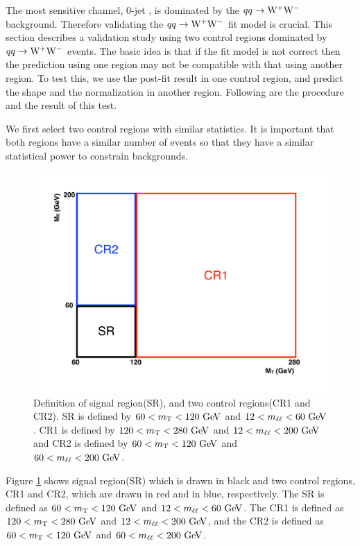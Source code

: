 The most sensitive channel, 0-jet \DF, is dominated by the $qq\rightarrow\mathrm{W}^+\mathrm{W}^-$ background. 
Therefore validating the $qq\rightarrow\mathrm{W}^+\mathrm{W}^-$ fit model is crucial. 
This section describes a validation study using two 
control regions dominated by $qq\rightarrow\mathrm{W}^+\mathrm{W}^-$ events.
The basic idea is that if the fit model is not correct then the prediction using 
one region may not be compatible with that using another region. To test this, 
we use the post-fit result in one control region, and predict the shape 
and the normalization in another region. 
Following are the procedure and the result of this test. 

We first select two control regions with similar statistics. It is important that 
both regions have a similar number of events so that they have a similar statistical 
power to constrain backgrounds. 
%
\begin{figure}[!hbtp]
\centering
\includegraphics[width=.6\textwidth]{figures/WWctl_scheme.pdf}
\caption{Definition of signal region(SR), and two control regions(CR1 and CR2). 
SR is defined by $60<m_{\mathrm{T}}<120~\mathrm{Ge\kern -0.1em V}$ and $12<m_{\ell\ell}<60~\mathrm{Ge\kern -0.1em V}$. 
CR1 is defined by $120<m_{\mathrm{T}}<280~\mathrm{Ge\kern -0.1em V}$ and $12<m_{\ell\ell}<200~\mathrm{Ge\kern -0.1em V}$ and 
CR2 is defined by $60<m_{\mathrm{T}}<120~\mathrm{Ge\kern -0.1em V}$ and $60<m_{\ell\ell}<200~\mathrm{Ge\kern -0.1em V}$. }
\label{fig:WWctlregions}
\end{figure}
Figure \ref{fig:WWctlregions} shows signal region(SR) which is drawn in black 
and two control regions, CR1 and CR2, which are drawn in red and in blue, respectively. 
The SR is defined as $60<m_{\mathrm{T}}<120~\mathrm{Ge\kern -0.1em V}$ and $12<m_{\ell\ell}<60~\mathrm{Ge\kern -0.1em V}$. 
The CR1 is defined as $120<m_{\mathrm{T}}<280~\mathrm{Ge\kern -0.1em V}$ and $12<m_{\ell\ell}<200~\mathrm{Ge\kern -0.1em V}$, 
and the CR2 is defined as $60<m_{\mathrm{T}}<120~\mathrm{Ge\kern -0.1em V}$ and $60<m_{\ell\ell}<200~\mathrm{Ge\kern -0.1em V}$. 
%
